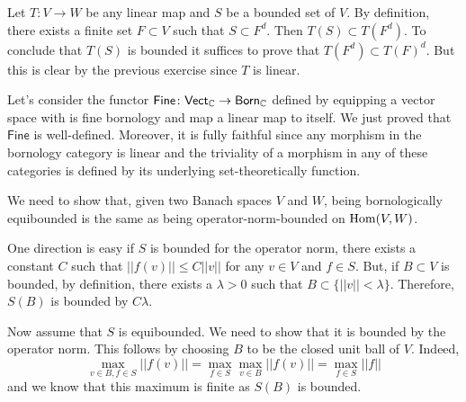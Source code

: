 \begin{solution}
    Let $T: V\to W$ be any linear map and $S$ be a bounded set of $V$. By definition, there exists a finite set $F\subset V$ such that $S\subset F^d$. Then $T(S) \subset T(F^d)$. To conclude that $T(S)$ is bounded it suffices to prove that $T(F^d)\subset T(F)^d$. But this is clear by the previous exercise since $T$ is linear.

    Let's consider the functor $\mathsf{Fine} \colon \mathsf{Vect}_{\mathbb C} \to \mathsf{Born}_\mathbb C$ defined by equipping a vector space with is fine bornology and map a linear map to itself. We just proved that $\mathsf{Fine}$ is well-defined. Moreover, it is fully faithful since any morphism in the bornology category is linear and the triviality of a morphism in any of these categories is defined by its underlying set-theoretically function. 
\end{solution}

\begin{solution}
    We need to show that, given two Banach spaces $V$ and $W$, being bornologically equibounded is the same as being operator-norm-bounded on $\operatorname{Hom}(V, W)$.   

    One direction is easy if $S$ is bounded for the operator norm, there exists a constant $C$ such that $||f(v)||\leq C||v||$ for any $v\in V$ and $f\in S$. But, if $B\subset V$ is bounded, by definition, there exists a $\lambda>0$ such that $B\subset\{||v||<\lambda\}$. Therefore, $S(B)$ is bounded by $C\lambda$. 

    Now assume that $S$ is equibounded. We need to show that it is bounded by the operator norm. This follows by choosing $B$ to be the closed unit ball of $V$. Indeed, 
    \[\max_{v\in B,f\in S} ||f(v)|| = \max_{f\in S}\max_{v\in B}||f(v)|| = \max_{f\in S}||f||\]
    and we know that this maximum is finite as $S(B)$ is bounded. 
\end{solution}

